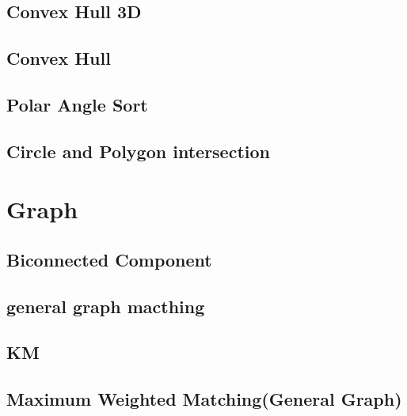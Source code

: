 \documentclass[a4paper,10pt,twocolumn,oneside]{article}
\begin{document}
\subsection{Convex Hull 3D}


\subsection{Convex Hull}


\subsection{Polar Angle Sort}


\subsection{Circle and Polygon intersection}


\section{Graph}
\subsection{Biconnected Component}


\subsection{general graph macthing}


%

\subsection{KM}


\subsection{Maximum Weighted Matching(General Graph)}

\end{document}
